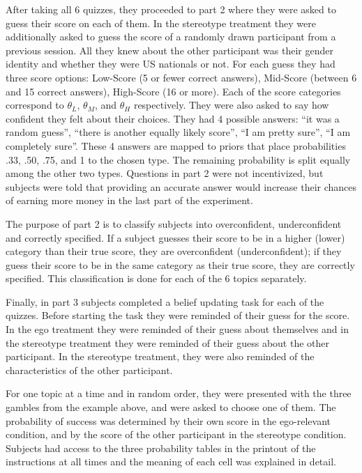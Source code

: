 \documentclass[
  12pt,
]{article}
\begin{document}
After taking all 6 quizzes, they proceeded to part 2 where they were
asked to guess their score on each of them. In the stereotype treatment
they were additionally asked to guess the score of a randomly drawn
participant from a previous session. All they knew about the other
participant was their gender identity and whether they were US nationals
or not. For each guess they had three score options: Low-Score (5 or
fewer correct answers), Mid-Score (between 6 and 15 correct answers),
High-Score (16 or more). Each of the score categories correspond to
\(\theta_L\), \(\theta_M\), and \(\theta_H\) respectively. They were
also asked to say how confident they felt about their choices. They had
4 possible answers: ``it was a random guess'', ``there is another
equally likely score'', ``I am pretty sure'', ``I am completely sure''.
These 4 answers are mapped to priors that place probabilities .33, .50,
.75, and 1 to the chosen type. The remaining probability is split
equally among the other two types. Questions in part 2 were not
incentivized, but subjects were told that providing an accurate answer
would increase their chances of earning more money in the last part of
the experiment.

The purpose of part 2 is to classify subjects into overconfident,
underconfident and correctly specified. If a subject guesses their score
to be in a higher (lower) category than their true score, they are
overconfident (underconfident); if they guess their score to be in the
same category as their true score, they are correctly specified. This
classification is done for each of the 6 topics separately.

Finally, in part 3 subjects completed a belief updating task for each of
the quizzes. Before starting the task they were reminded of their guess
for the score. In the ego treatment they were reminded of their guess
about themselves and in the stereotype treatment they were reminded of
their guess about the other participant. In the stereotype treatment,
they were also reminded of the characteristics of the other participant.

For one topic at a time and in random order, they were presented with
the three gambles from the example above, and were asked to choose one
of them. The probability of success was determined by their own score in
the ego-relevant condition, and by the score of the other participant in
the stereotype condition. Subjects had access to the three probability
tables in the printout of the instructions at all times and the meaning
of each cell was explained in detail.
\end{document}
